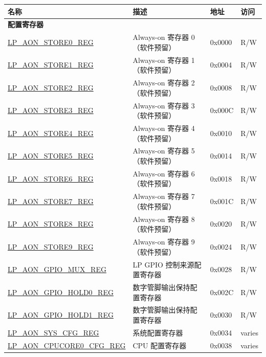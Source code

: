 \begin{longtable}{ | p{6cm} | p{7.2cm} | p{1.3cm} | p{1cm} | }
\hline\rowcolor{lightgray}
\textbf{名称} & \textbf{描述} & \textbf{地址} & \textbf{访问} \\ \hline
\endhead
\multicolumn{4}{|l|}{\textbf{配置寄存器}} \\ \hline
\hyperref[regdesc:LPAONSTORENREG]{LP\_AON\_STORE0\_REG} & Always-on 寄存器 0（软件预留） & 0x0000 & R/W \\ \hline
\hyperref[regdesc:LPAONSTORENREG]{LP\_AON\_STORE1\_REG} & Always-on 寄存器 1（软件预留） & 0x0004 & R/W \\ \hline
\hyperref[regdesc:LPAONSTORENREG]{LP\_AON\_STORE2\_REG} & Always-on 寄存器 2（软件预留） & 0x0008 & R/W \\ \hline
\hyperref[regdesc:LPAONSTORENREG]{LP\_AON\_STORE3\_REG} & Always-on 寄存器 3（软件预留） & 0x000C & R/W \\ \hline
\hyperref[regdesc:LPAONSTORENREG]{LP\_AON\_STORE4\_REG} & Always-on 寄存器 4（软件预留） & 0x0010 & R/W \\ \hline
\hyperref[regdesc:LPAONSTORENREG]{LP\_AON\_STORE5\_REG} & Always-on 寄存器 5（软件预留） & 0x0014 & R/W \\ \hline
\hyperref[regdesc:LPAONSTORENREG]{LP\_AON\_STORE6\_REG} & Always-on 寄存器 6（软件预留） & 0x0018 & R/W \\ \hline
\hyperref[regdesc:LPAONSTORENREG]{LP\_AON\_STORE7\_REG} & Always-on 寄存器 7（软件预留） & 0x001C & R/W \\ \hline
\hyperref[regdesc:LPAONSTORENREG]{LP\_AON\_STORE8\_REG} & Always-on 寄存器 8（软件预留） & 0x0020 & R/W \\ \hline
\hyperref[regdesc:LPAONSTORENREG]{LP\_AON\_STORE9\_REG} & Always-on 寄存器 9（软件预留） & 0x0024 & R/W \\ \hline
\hyperref[regdesc:LPAONGPIOMUXREG]{LP\_AON\_GPIO\_MUX\_REG} & LP GPIO 控制来源配置寄存器 & 0x0028 & R/W \\ \hline
\hyperref[regdesc:LPAONGPIOHOLD0REG]{LP\_AON\_GPIO\_HOLD0\_REG} & 数字管脚输出保持配置寄存器 & 0x002C & R/W \\ \hline
\hyperref[regdesc:LPAONGPIOHOLD1REG]{LP\_AON\_GPIO\_HOLD1\_REG} & 数字管脚输出保持配置寄存器 & 0x0030 & R/W \\ \hline
\hyperref[regdesc:LPAONSYSCFGREG]{LP\_AON\_SYS\_CFG\_REG} & 系统配置寄存器 & 0x0034 & varies \\ \hline
\hyperref[regdesc:LPAONCPUCORE0CFGREG]{LP\_AON\_CPUCORE0\_CFG\_REG} & CPU 配置寄存器 & 0x0038 & varies \\ \hline

\end{longtable}
